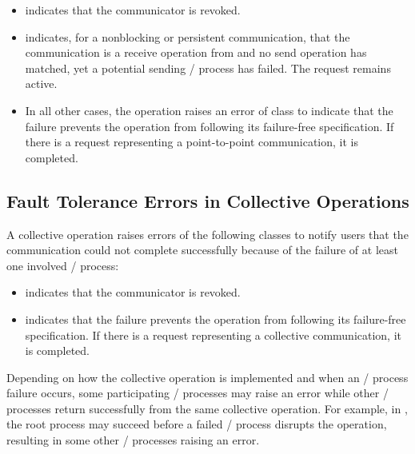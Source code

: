 \begin{itemize}

\item {} indicates that the communicator is revoked.

\item {} indicates, for a nonblocking or persistent communication,
   that the communication is a receive operation from
    and no send operation has matched, yet
    a potential sending \MPI/ process has failed. The request remains
    active.

\item In all other cases, the operation raises an error of class
     to indicate that the failure prevents the
    operation from following its failure-free specification. If there is a
    request representing a point-to-point communication, it is completed.

\end{itemize}

\subsection{Fault Tolerance Errors in Collective Operations}
\label{sec:ft-notification:coll}

A collective operation raises errors of the following classes to notify
users that the communication could not complete successfully because of
the failure of at least one involved \MPI/ process:

\begin{itemize}

\item {} indicates that the communicator is revoked.

\item {} indicates that the failure prevents the
    operation from following its failure-free specification. If there is a
    request representing a collective communication, it is completed.

\end{itemize}


\begin{users}

Depending on how the collective operation is implemented and when an \MPI/ process
failure occurs, some participating \MPI/ processes may raise an error while
other \MPI/ processes return successfully from the same collective operation. For
example, in , the root process may succeed before a failed
\MPI/ process disrupts the operation, resulting in some other \MPI/ processes raising an
error.

\end{users}

